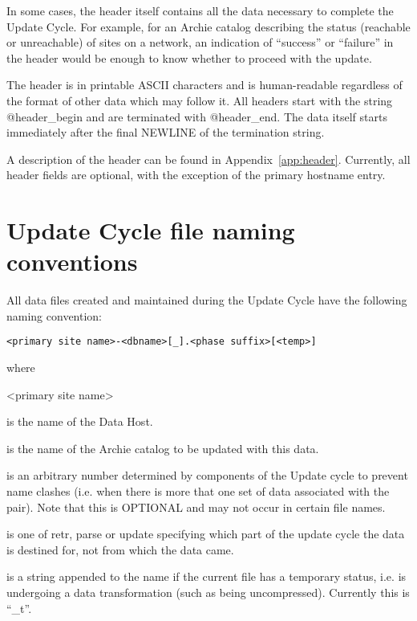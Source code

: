 In some cases, the header itself contains all the data necessary to complete
the Update Cycle. For example, for an Archie catalog describing the status
(reachable or unreachable) of sites on a network, an indication of ``success''
or ``failure'' in the header would be enough to know whether to proceed with the
update.

The header is in printable ASCII characters and is human-readable regardless
of the format of other data which may follow it. All headers start with
the string @header\_begin and are terminated with @header\_end. The data itself
starts immediately after the final NEWLINE of the termination string.


A description of the header can be found in Appendix~\ref{app:header}.
Currently, all header fields are optional, with the exception of the primary
hostname entry.

\section{Update Cycle file naming conventions}

All data files created and maintained during the Update Cycle have the
following naming convention:

\texttt{<primary site name>-<dbname>[\_<id number>].<phase suffix>[<temp>]}

\noindent where

\begin{TTentry}{<primary site name>}

\item[<primary site name>]
is the name of the Data Host.

\item[<dbname>]
is the name of the Archie catalog to be updated with this data.

\item[<id number>]
is an arbitrary number determined by components of the Update
cycle to prevent name clashes (i.e. when there is more that one set of data
associated with the  pair). Note that this is
OPTIONAL and may not occur in certain file names.

\item[<phase suffix>]
is one of retr, parse or update specifying which part of the
update cycle the data is destined for, not from which the data came.

\item[<temp>]
is a string appended to the name if the current file has a temporary
status, i.e. is undergoing a data transformation (such as being
uncompressed). Currently this is ``\_t''.

\end{TTentry}

